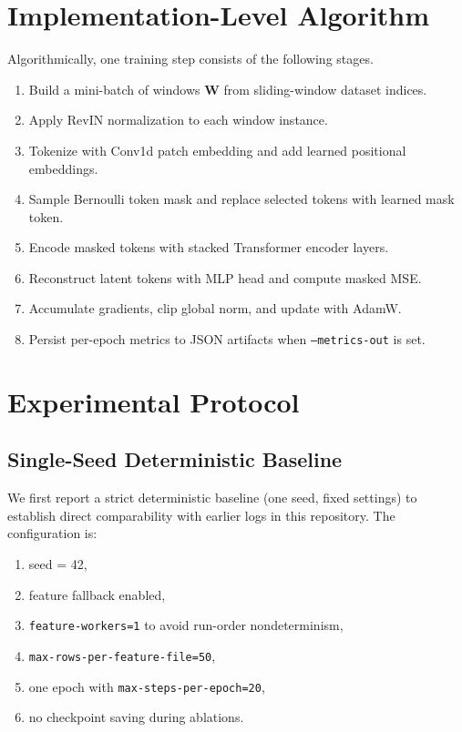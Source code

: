 \documentclass[conference]{IEEEtran}
\begin{document}
\section{Implementation-Level Algorithm}
Algorithmically, one training step consists of the following stages.
\begin{enumerate}
    \item Build a mini-batch of windows $\mathbf{W}$ from sliding-window dataset indices.
    \item Apply RevIN normalization to each window instance.
    \item Tokenize with Conv1d patch embedding and add learned positional embeddings.
    \item Sample Bernoulli token mask and replace selected tokens with learned mask token.
    \item Encode masked tokens with stacked Transformer encoder layers.
    \item Reconstruct latent tokens with MLP head and compute masked MSE.
    \item Accumulate gradients, clip global norm, and update with AdamW.
    \item Persist per-epoch metrics to JSON artifacts when \texttt{--metrics-out} is set.
\end{enumerate}

\section{Experimental Protocol}
\subsection{Single-Seed Deterministic Baseline}
We first report a strict deterministic baseline (one seed, fixed settings) to establish direct comparability with earlier logs in this repository. The configuration is:
\begin{enumerate}
    \item seed = 42,
    \item feature fallback enabled,
    \item \texttt{feature-workers=1} to avoid run-order nondeterminism,
    \item \texttt{max-rows-per-feature-file=50},
    \item one epoch with \texttt{max-steps-per-epoch=20},
    \item no checkpoint saving during ablations.
\end{enumerate}
\end{document}
